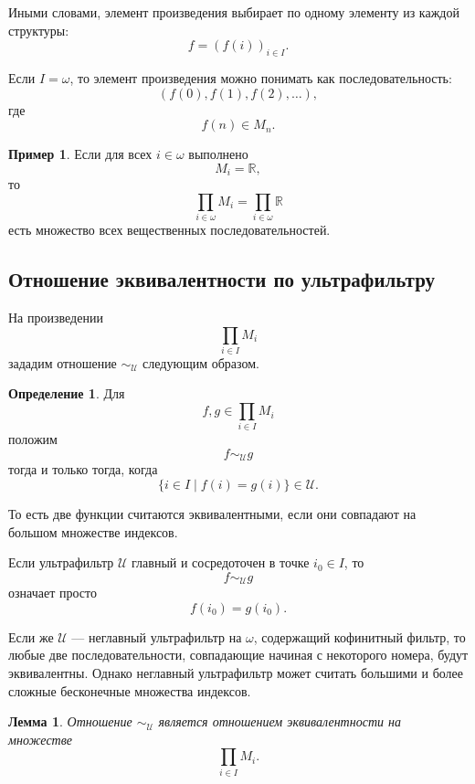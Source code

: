 \documentclass[12pt,a4paper,oneside,openany]{book}
\theoremstyle{definition}
\newtheorem{definition}{Определение}[chapter]
\newtheorem{example}{Пример}[chapter]
\theoremstyle{plain}
\newtheorem{lemma}{Лемма}[chapter]
\theoremstyle{remark}
\begin{document}
Иными словами, элемент произведения выбирает по одному элементу из каждой структуры:
\[
f=(f(i))_{i\in I}.
\]

Если $I=\omega$, то элемент произведения можно понимать как последовательность:
\[
(f(0),f(1),f(2),\ldots),
\]
где
\[
f(n)\in M_n.
\]

\begin{example}
Если для всех $i\in\omega$ выполнено
\[
M_i=\mathbb R,
\]
то
\[
\prod_{i\in\omega} M_i
=
\prod_{i\in\omega}\mathbb R
\]
есть множество всех вещественных последовательностей.
\end{example}

\subsection{Отношение эквивалентности по ультрафильтру}

На произведении
\[
\prod_{i\in I} M_i
\]
зададим отношение $\sim_{\mathcal U}$ следующим образом.

\begin{definition}
Для
\[
f,g\in\prod_{i\in I}M_i
\]
положим
\[
f\sim_{\mathcal U} g
\]
тогда и только тогда, когда
\[
\{i\in I\mid f(i)=g(i)\}\in\mathcal U.
\]
\end{definition}

То есть две функции считаются эквивалентными, если они совпадают на большом множестве индексов.

Если ультрафильтр $\mathcal U$ главный и сосредоточен в точке $i_0\in I$, то
\[
f\sim_{\mathcal U}g
\]
означает просто
\[
f(i_0)=g(i_0).
\]

Если же $\mathcal U$ — неглавный ультрафильтр на $\omega$, содержащий кофинитный фильтр, то любые две последовательности, совпадающие начиная с некоторого номера, будут эквивалентны. Однако неглавный ультрафильтр может считать большими и более сложные бесконечные множества индексов.

\begin{lemma}
Отношение $\sim_{\mathcal U}$ является отношением эквивалентности на множестве
\[
\prod_{i\in I}M_i.
\]
\end{lemma}
\end{document}
